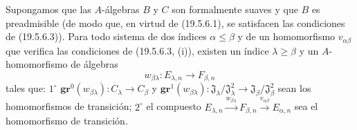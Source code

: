 \begin{lemma}[19.5.6.5]
\label{0.19.5.6.5-fr}
Supongamos que las $A$-álgebras $B$ y $C$ son formalmente suaves y que
$B$ es preadmisible (de modo que, en virtud de \textup{(19.5.6.1)}, se satisfacen las
condiciones de \textup{(19.5.6.3)}). Para todo sistema de dos índices
$\alpha\leq\beta$ y de un homomorfismo $v_{\alpha\beta}$ que verifica las
condiciones de \textup{(19.5.6.3, (i))}, existen un índice $\lambda\geq\beta$ y un
$A$-homomorfismo de álgebras
\[
  w_{\beta\lambda}:E_{\lambda,n}\longrightarrow F_{\beta,n}
\]
tales que: $1^\circ$ $\mathbf{gr}^0(w_{\beta\lambda}):C_\lambda\to C_\beta$ y
$\mathbf{gr}^1(w_{\beta\lambda}):
\mathfrak J_\lambda/\mathfrak J_\lambda^2\to
\mathfrak J_\beta/\mathfrak J_\beta^2$ sean los homomorfismos de
transición; $2^\circ$ el compuesto
$E_{\lambda,n}\xrightarrow{w_{\beta\lambda}}F_{\beta,n}
\xrightarrow{v_{\alpha\beta}}E_{\alpha,n}$ sea el homomorfismo de transición.
\end{lemma}

